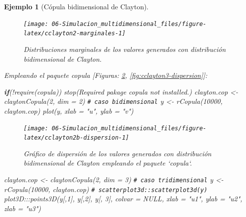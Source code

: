 \documentclass[
  10pt,
]{book}
\newenvironment{Shaded}{\begin{snugshade}}{\end{snugshade}}
\newcommand{\AttributeTok}[1]{\textcolor[rgb]{0.77,0.63,0.00}{#1}}
\newcommand{\CommentTok}[1]{\textcolor[rgb]{0.56,0.35,0.01}{\textit{#1}}}
\newcommand{\ConstantTok}[1]{\textcolor[rgb]{0.00,0.00,0.00}{#1}}
\newcommand{\ControlFlowTok}[1]{\textcolor[rgb]{0.13,0.29,0.53}{\textbf{#1}}}
\newcommand{\DecValTok}[1]{\textcolor[rgb]{0.00,0.00,0.81}{#1}}
\newcommand{\FunctionTok}[1]{\textcolor[rgb]{0.00,0.00,0.00}{#1}}
\newcommand{\NormalTok}[1]{#1}
\newcommand{\OtherTok}[1]{\textcolor[rgb]{0.56,0.35,0.01}{#1}}
\newcommand{\SpecialCharTok}[1]{\textcolor[rgb]{0.00,0.00,0.00}{#1}}
\newcommand{\StringTok}[1]{\textcolor[rgb]{0.31,0.60,0.02}{#1}}
\theoremstyle{break}
\newtheorem{example}{Ejemplo}[chapter]
\theoremstyle{nonumberplain}
\renewcommand{\CommentTok}[1]{\textcolor[rgb]{0.41,0.41,0.41}{\texttt{#1}}}
\begin{document}
\begin{example}[Cópula bidimensional de Clayton]
\begin{figure}[!htbp]

{\centering \texttt{[image: 06-Simulacion\_multidimensional\_files/figure-latex/cclayton2-marginales-1]} 

}

\caption{Distribuciones marginales de los valores generados con distribución bidimensional de Clayton.}\label{fig:cclayton2-marginales}
\end{figure}

Empleando el paquete \emph{copula} {[}Figuras: \ref{fig:cclayton2b-dispersion}, \ref{fig:cclayton3-dispersion}{]}:

\begin{Shaded}
\begin{Highlighting}[]
\ControlFlowTok{if}\NormalTok{(}\SpecialCharTok{!}\FunctionTok{require}\NormalTok{(copula)) }\FunctionTok{stop}\NormalTok{(}\StringTok{\textquotesingle{}Required pakage \textasciigrave{}copula\textasciigrave{} not installed.\textquotesingle{}}\NormalTok{)}
\NormalTok{clayton.cop }\OtherTok{\textless{}{-}} \FunctionTok{claytonCopula}\NormalTok{(}\DecValTok{2}\NormalTok{, }\AttributeTok{dim =} \DecValTok{2}\NormalTok{) }\CommentTok{\# caso bidimensional}
\NormalTok{y }\OtherTok{\textless{}{-}} \FunctionTok{rCopula}\NormalTok{(}\DecValTok{10000}\NormalTok{, clayton.cop)}
\FunctionTok{plot}\NormalTok{(y, }\AttributeTok{xlab =} \StringTok{"u"}\NormalTok{, }\AttributeTok{ylab =} \StringTok{"v"}\NormalTok{)}
\end{Highlighting}
\end{Shaded}

\begin{figure}[!htbp]

{\centering \texttt{[image: 06-Simulacion\_multidimensional\_files/figure-latex/cclayton2b-dispersion-1]} 

}

\caption{Gráfico de dispersión de los valores generados con distribución bidimensional de Clayton empleando el paquete `copula`.}\label{fig:cclayton2b-dispersion}
\end{figure}



\begin{Shaded}
\begin{Highlighting}[]
\NormalTok{clayton.cop }\OtherTok{\textless{}{-}} \FunctionTok{claytonCopula}\NormalTok{(}\DecValTok{2}\NormalTok{, }\AttributeTok{dim =} \DecValTok{3}\NormalTok{) }\CommentTok{\# caso tridimensional}
\NormalTok{y }\OtherTok{\textless{}{-}} \FunctionTok{rCopula}\NormalTok{(}\DecValTok{10000}\NormalTok{, clayton.cop)}
\CommentTok{\# scatterplot3d::scatterplot3d(y)}
\NormalTok{plot3D}\SpecialCharTok{:::}\FunctionTok{points3D}\NormalTok{(y[,}\DecValTok{1}\NormalTok{], y[,}\DecValTok{2}\NormalTok{], y[, }\DecValTok{3}\NormalTok{], }\AttributeTok{colvar =} \ConstantTok{NULL}\NormalTok{, }
                  \AttributeTok{xlab =} \StringTok{"u1"}\NormalTok{, }\AttributeTok{ylab =} \StringTok{"u2"}\NormalTok{, }\AttributeTok{zlab =} \StringTok{"u3"}\NormalTok{) }
\end{Highlighting}
\end{Shaded}


\end{example}
\end{document}
